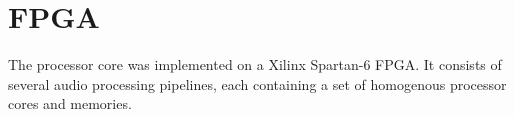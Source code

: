 \FloatBarrier
\chapter{FPGA}\label{chapter:fpga}

The processor core was implemented on a Xilinx Spartan-6 FPGA. It consists
of several audio processing pipelines, each containing a set of homogenous
processor cores and memories. 









